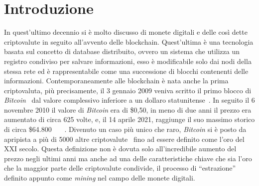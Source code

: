 \documentclass[conference, italian]{IEEEtran}
\begin{document}
\section{Introduzione}\label{sec:introduction}
In quest'ultimo decennio si è molto discusso di monete digitali e delle così dette criptovalute in seguito all'avvento delle blockchain. Quest'ultima è una tecnologia basata sul concetto di database distribuito, ovvero un sistema che utilizza un registro condiviso per salvare informazioni, esso è modificabile solo dai nodi della stessa rete ed è rappresentabile come una successione di blocchi contenenti delle informazioni. Contemporaneamente alle blockchain è nata anche la prima criptovaluta, più precisamente, il 3 gennaio 2009 veniva scritto il primo blocco di \emph{Bitcoin}~\cite{nakamoto2019bitcoin} dal valore complessivo inferiore a un dollaro statunitense~\citep{kharraz2019outguard}. In seguito il 6 novembre 2010 il valore di \emph{Bitcoin} era di \$0,50, in meno di due anni il prezzo era aumentato di circa 625 volte, e, il 14 aprile 2021, raggiunge il suo massimo storico di circa \$64.800 ~\citep{bitcoinwiki}~\citep{wiredbitcoin}~\citep{coingeckoATH}. Divenuto un caso più unico che raro, \emph{Bitcoin} si è posto da apripista a più di 5000 altre criptovalute~\citep{coinlore} fino ad essere definito come l'oro del \RN{21} secolo. Questa definizione non è dovuta solo all'incredibile aumento del prezzo negli ultimi anni ma anche ad una delle caratteristiche chiave che sia l'oro che la maggior parte delle criptovalute condivide, il processo di ``estrazione'' definito appunto come \emph{mining} nel campo delle monete digitali.\\
\end{document}
